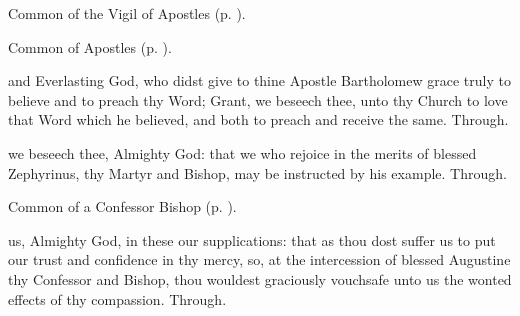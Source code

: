 \clearpage
{}

\begin{rubric}
	Common of the Vigil of Apostles (p. \pageref{CommonVigilApostles}).
\end{rubric}



\begin{rubric}
	Common of Apostles (p. \pageref{CommonApostles}).
\end{rubric}





\collect
{} and Everlasting God, who didst give to thine Apostle Bartholomew grace truly to believe and to preach thy Word; Grant, we beseech thee, unto thy Church to love that Word which he believed, and both to preach and receive the same. Through.



\memorialCollect
{} we beseech thee, Almighty God: that we who rejoice in the merits of blessed Zephyrinus, thy Martyr and Bishop, may be instructed by his example. Through.



\begin{rubric}
	Common of a Confessor Bishop (p. \pageref{CommonConfessorBishop}).
\end{rubric}

{} us, Almighty God, in these our supplications: that as thou dost suffer us to put our trust and confidence in thy mercy, so, at the intercession of blessed Augustine thy Confessor and Bishop, thou wouldest graciously vouchsafe unto us the wonted effects of thy compassion. Through.

